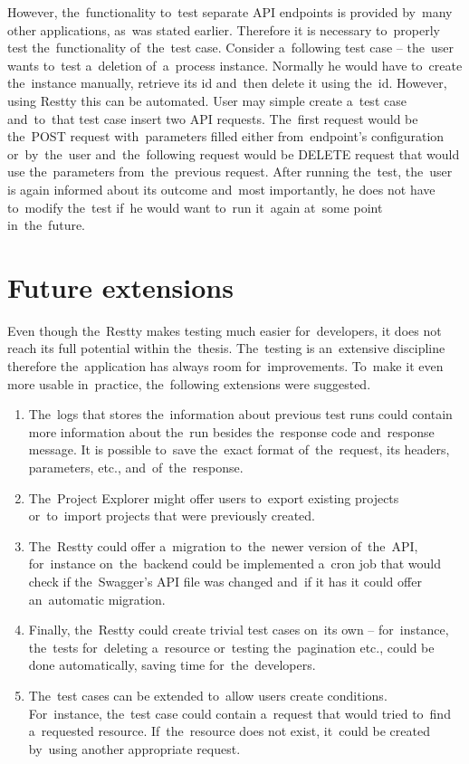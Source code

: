 However, the~functionality to~test separate API endpoints is provided by~many other applications, as~was stated earlier. Therefore it is necessary 
to~properly test the~functionality of~the~test case. Consider a~following test case -- the~user wants to~test a~deletion of~a~process instance. Normally
he would have to~create the~instance manually, retrieve its id and~then delete it using the~id. However, using Restty this can be automated. User may simple
create a~test case and~to~that test case insert two API requests. The~first request would be the~POST request with~parameters filled 
either from~endpoint's configuration or~by~the~user and~the~following request would be DELETE request that would use the~parameters from~the~previous request.
After running the~test, the~user is again informed about its outcome and~most importantly, he does not have to~modify the~test if~he would want to~run it~again
at~some point in~the~future.

\section{Future extensions}
\label{Improvements}
Even though the~Restty makes testing much easier for~developers, it does not reach its full potential within the~thesis.
The~testing is an~extensive discipline therefore the~application has always room for~improvements. To~make it even more usable 
in~practice, the~following extensions were suggested.

\begin{enumerate}
  \item The~logs that stores the~information about previous test runs could contain more information about the~run besides the~response code and~response message.
  It is possible to~save the~exact format of~the~request, its headers, parameters, etc., and~of~the~response.
  \item The~Project Explorer might offer users to~export existing projects or~to~import projects that were previously created.
  \item The~Restty could offer a~migration to~the~newer version of~the~API, for~instance on~the~backend could be implemented a~cron job that would check if
  the~Swagger's API file was changed and~if it has it could offer an~automatic migration.
  \item Finally, the~Restty could create trivial test cases on~its own -- for~instance, the~tests for~deleting a~resource or~testing the~pagination etc., could
  be done automatically, saving time for~the~developers. 
  \item The~test cases can be extended to~allow users create conditions. For~instance, the~test case could contain a~request that would tried to~find
  a~requested resource. If~the~resource does not exist, it~could be created by~using another appropriate request.
\end{enumerate}

